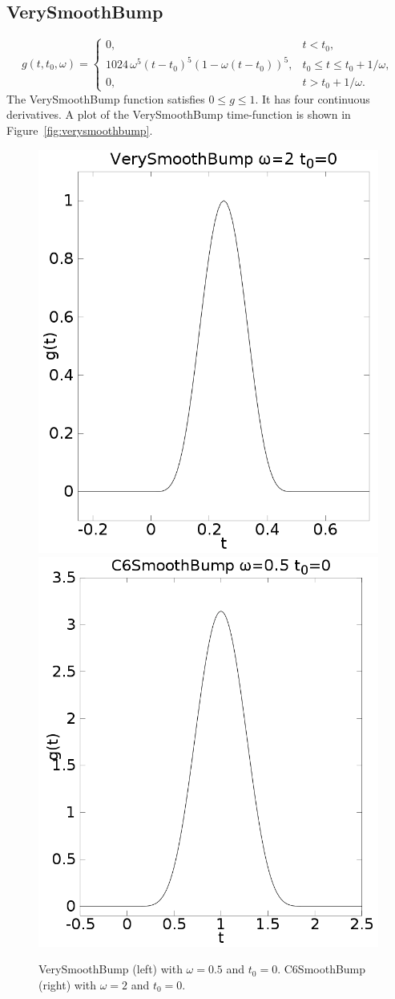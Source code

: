 \documentclass[11pt]{report}
\begin{document}
\subsection{VerySmoothBump} 
\[
g(t,t_0,\omega) = \left\{ 
\begin{array}{ll} 
0, & t < t_0,\\ 
1024\,\omega^5(t-t_0)^5 (1 - \omega(t-t_0))^5,& t_0 \leq t \leq t_0+1/\omega,\\ 
0, & t > t_0 + 1/\omega.
\end{array}
\right.
\]
The VerySmoothBump function satisfies $0\leq g\leq 1$. It has four continuous derivatives.
A plot of the VerySmoothBump time-function is shown in Figure~\ref{fig:verysmoothbump}.
\begin{figure}
\begin{centering}
  \includegraphics[height=0.4\linewidth]{figures/f11-verysmoothbump.png}
\hspace{10mm}
  \includegraphics[height=0.4\linewidth]{figures/f12-c6smoothbump.png}
  \caption{VerySmoothBump (left) with $\omega=0.5$ and
    $t_0=0$. C6SmoothBump (right) with $\omega=2$ and $t_0=0$.}
  \label{fig:verysmoothbump}  \label{fig:c6smoothbump}
\end{centering}
\end{figure}  
%
\end{document}
